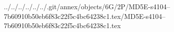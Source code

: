 ../../../../../../.git/annex/objects/6G/2P/MD5E-s4104--7b60910b50eb6f83c22f5c4bc64238c1.tex/MD5E-s4104--7b60910b50eb6f83c22f5c4bc64238c1.tex